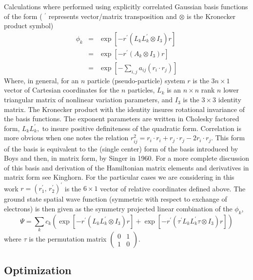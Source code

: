 \documentclass[12pt,thmsa]{article}
\begin{document}
Calculations where performed using explicitly correlated Gaussian basis
functions of the form ( $^{\prime }$ represents vector/matrix transposition
and $\otimes $ is the Kronecker product symbol) 
\begin{eqnarray}
\phi _k &=&\exp \left[ -r^{\prime }\left( L_kL_k^{\prime }\otimes I_3\right)
r\right]  \label{ECG} \\
&=&\exp \left[ -r^{\prime }\left( A_k\otimes I_3\right) r\right]  \nonumber
\\
&=&\exp \left[ -\sum_{i,j}a_{ij}\left( r_i\cdot r_j\right) \right]  \nonumber
\end{eqnarray}
Where, in general, for an $n$ particle (pseudo-particle) system $r$ is the $%
3n\times 1$ vector of Cartesian coordinates for the $n$ particles, $L_k$ is
an $n\times n$ rank $n$ lower triangular matrix of nonlinear variation
parameters, and $I_3$ is the $3\times 3$ identity matrix. The Kronecker
product with the identity insures rotational invariance of the basis
functions. The exponent parameters are written in Cholesky factored form, $%
L_kL_k^{\prime },$ to insure positive definiteness of the quadratic form.
Correlation is more obvious when one notes the relation $r_{ij}^2=r_i\cdot
r_i+r_j\cdot r_j-2r_i\cdot r_j.$ This form of the basis is equivalent to the
(single center) form of the basis introduced by Boys\cite{Boys} and then, in
matrix form, by Singer\cite{Singer1} in 1960. For a more complete discussion
of this basis and derivation of the Hamiltonian matrix elements and
derivatives in matrix form see Kinghorn\cite{Kinghorn95a,Kinghorn95b}. For
the particular cases we are considering in this work $r=\left( r_1^{\prime
},\,r_2^{\prime }\right) ^{\prime }$ is the $6\times 1$ vector of relative
coordinates defined above. The ground state spatial wave function (symmetric
with respect to exchange of electrons) is then given as the symmetry
projected linear combination of the $\phi _k$, 
\begin{equation}
\Psi =\sum_kc_k\left( \exp \left[ -r^{\prime }\left( L_kL_k^{\prime }\otimes
I_3\right) r\right] +\exp \left[ -r^{\prime }\left( \tau ^{\prime
}L_kL_k^{\prime }\tau \otimes I_3\right) r\right] \right)
\end{equation}
where $\tau $ is the permutation matrix $\left( 
\begin{array}{cc}
0 & 1 \\ 
1 & 0
\end{array}
\right) .$

\subsection{Optimization}
\end{document}
